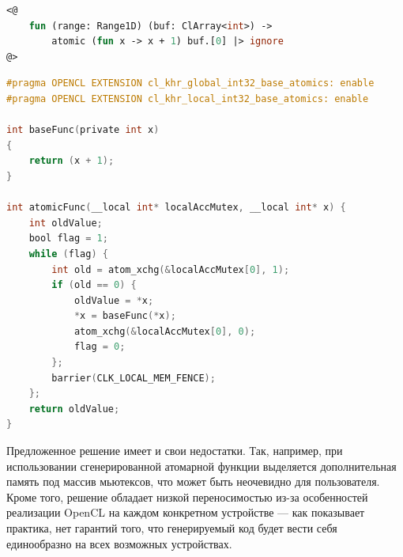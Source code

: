 \begin{lstlisting}[caption=Код OpenCL ядра на языке F\#, language=Caml, frame=single, label={lst:atomicKernel}]
<@
    fun (range: Range1D) (buf: ClArray<int>) ->
        atomic (fun x -> x + 1) buf.[0] |> ignore
@>
\end{lstlisting}

\begin{lstlisting}[caption=Код OpenCL ядра после трансляции в C, language=C, frame=single, label={lst:generatedAtomic}]
#pragma OPENCL EXTENSION cl_khr_global_int32_base_atomics: enable
#pragma OPENCL EXTENSION cl_khr_local_int32_base_atomics: enable

int baseFunc(private int x)
{
    return (x + 1);
}

int atomicFunc(__local int* localAccMutex, __local int* x) {
    int oldValue;
    bool flag = 1;
    while (flag) {
        int old = atom_xchg(&localAccMutex[0], 1);
        if (old == 0) {
            oldValue = *x;
            *x = baseFunc(*x);
            atom_xchg(&localAccMutex[0], 0);
            flag = 0;
        };
        barrier(CLK_LOCAL_MEM_FENCE);
    };
    return oldValue;
}
\end{lstlisting}


Предложенное решение имеет и свои недостатки. Так, например, при использовании сгенерированной атомарной функции выделяется дополнительная память под массив мьютексов, что может быть неочевидно для пользователя. Кроме того, решение обладает низкой переносимостью из-за особенностей реализации OpenCL на каждом конкретном устройстве --- как показывает практика, нет гарантий того, что генерируемый код будет вести себя единообразно на всех возможных устройствах.

